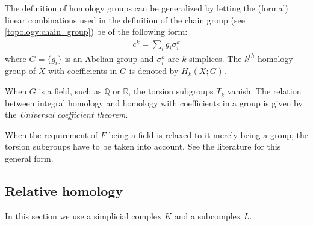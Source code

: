 	\begin{construct}
		The definition of homology groups can be generalized by letting the (formal) linear combinations used in the definition of the chain group (see \ref{topology:chain_group}) be of the following form:
		\begin{gather}
			c^k = \sum_ig_i\sigma_i^k
		\end{gather}
		where $G = \{g_i\}$ is an Abelian group and $\sigma_i^k$ are $k$-simplices. The $k^{th}$ homology group of $X$ with coefficients in $G$ is denoted by $H_k(X; G)$.
	\end{construct}
	\begin{property}
		When $G$ is a field, such as $\mathbb{Q}$ or $\mathbb{R}$, the torsion subgroups $T_k$ vanish. The relation between integral homology and homology with coefficients in a group is given by the \textit{Universal coefficient theorem}.
	\end{property}

	\begin{remark*}
		When the requirement of $F$ being a field is relaxed to it merely being a group, the torsion subgroups have to be taken into account. See the literature for this general form.
	\end{remark*}

\subsection{Relative homology}

	In this section we use a simplicial complex $K$ and a subcomplex $L$.

